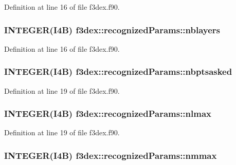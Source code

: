 Definition at line 16 of file f3dex.f90.

\hypertarget{typef3dex_1_1recognized_params_a8198a96740db934ad856b3f7a8ec8ccc}{
\subsubsection[{nblayers}]{\setlength{\rightskip}{0pt plus 5cm}INTEGER(I4B) {\bf f3dex::recognizedParams::nblayers}}}
\label{typef3dex_1_1recognized_params_a8198a96740db934ad856b3f7a8ec8ccc}


Definition at line 16 of file f3dex.f90.

\hypertarget{typef3dex_1_1recognized_params_a8fb61e9ee4c1d2fa3556ca6984164e5b}{
\subsubsection[{nbptsasked}]{\setlength{\rightskip}{0pt plus 5cm}INTEGER(I4B) {\bf f3dex::recognizedParams::nbptsasked}}}
\label{typef3dex_1_1recognized_params_a8fb61e9ee4c1d2fa3556ca6984164e5b}


Definition at line 19 of file f3dex.f90.

\hypertarget{typef3dex_1_1recognized_params_abc9d1823a8586809d2585c9ec2ceb5a4}{
\subsubsection[{nlmax}]{\setlength{\rightskip}{0pt plus 5cm}INTEGER(I4B) {\bf f3dex::recognizedParams::nlmax}}}
\label{typef3dex_1_1recognized_params_abc9d1823a8586809d2585c9ec2ceb5a4}


Definition at line 19 of file f3dex.f90.

\hypertarget{typef3dex_1_1recognized_params_abd50eff73fd13cb901529d8ce1d32ced}{
\subsubsection[{nmmax}]{\setlength{\rightskip}{0pt plus 5cm}INTEGER(I4B) {\bf f3dex::recognizedParams::nmmax}}}
\label{typef3dex_1_1recognized_params_abd50eff73fd13cb901529d8ce1d32ced}


